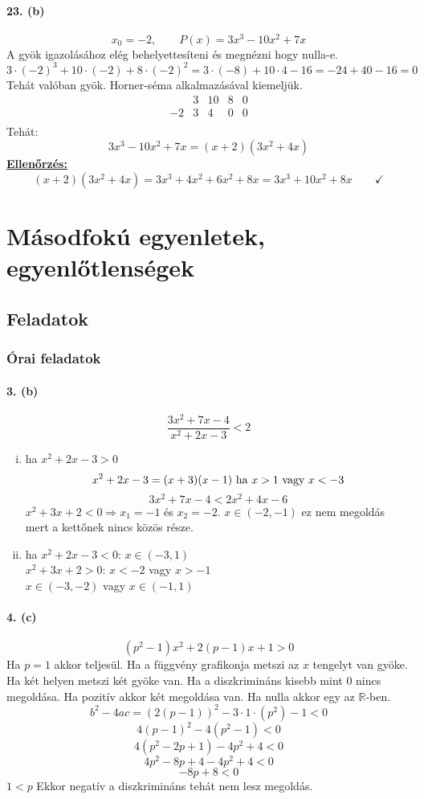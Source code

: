 \documentclass[12pt,a4paper,fleqn]{article}
\newcommand{\myparagraph}[1]{\paragraph{#1}\mbox{}}
\begin{document}
\myparagraph{23. (b)}
\[ x_0 = -2, \qquad P(x) = 3x^3 - 10x^2 + 7x \]
A gyök igazolásához elég behelyettesíteni és megnézni hogy nulla-e.
\[ 3 \cdot (-2)^3 + 10 \cdot (-2) + 8 \cdot (-2)^2 = 3 \cdot (-8) + 10 \cdot 4 - 16 = -24 + 40 - 16 = 0 \]
Tehát valóban gyök. Horner-séma alkalmazásával kiemeljük.
\[
  \begin{array}{c|cccc}
    & 3 & 10 & 8 & 0 \\ \hline
 -2 & 3 & 4  & 0 & 0 \\
 \end{array}
\]
Tehát:
\[
  3x^3 - 10x^2 + 7x=(x+2)(3x^2+4x)
\]
\underline{\textbf{Ellenőrzés:}}
\[
  (x+2)(3x^2+4x)=3x^3+4x^2+6x^2+8x=3x^3+10x^2+8x
  \qquad \checkmark
\]

\section{Másodfokú egyenletek, egyenlőtlenségek}
\setcounter{subsection}{1}
\subsection{Feladatok}
\subsubsection{Órai feladatok}


\myparagraph{3. (b)}
\[ \dfrac{3x^2+7x-4}{x^2+2x-3} < 2 \]
\begin{enumerate}[i.]
  \item ha $x^2+2x-3 > 0$
  \[ x^2+2x-3 = (x+3)(x-1)$ ha $x>1$ vagy $x<-3 \]
  \[ 3x^2+7x-4 < 2x^2+4x-6 \]
  $x^2 + 3x + 2 < 0 \Rightarrow x_1=-1$ és $x_2=-2$. $x \in (-2, -1)$ ez nem megoldás
  mert a kettőnek nincs közös része.
  \item ha $x^2+2x-3 < 0$: $x \in (-3, 1)$ \\
  $x^2+3x+2 > 0$: $x<-2$ vagy $x>-1$ \\
  $x \in (-3, -2)$ vagy $x \in (-1, 1)$
\end{enumerate}


\myparagraph{4. (c)}
\[ (p^2-1)x^2 + 2(p-1)x + 1 > 0 \]
Ha $p=1$ akkor teljesül.
Ha a függvény grafikonja metszi az $x$ tengelyt van gyöke. Ha két helyen metszi
két gyöke van. Ha a diszkrimináns kisebb mint 0 nincs megoldása. Ha pozitív
akkor két megoldása van. Ha nulla akkor egy az $\mathbb{R}$-ben.
\[ b^2-4ac=(2(p-1))^2-3 \cdot 1 \cdot (p^2)-1 < 0 \]
\[ 4(p-1)^2 - 4(p^2 - 1) < 0 \]
\[ 4(p^2 - 2p + 1) - 4p^2 + 4 < 0 \]
\[ 4p^2 - 8p + 4 - 4p^2 + 4 < 0 \]
\[ -8p + 8 < 0 \]
$ 1 < p $ Ekkor negatív a diszkrimináns tehát nem lesz megoldás.
\end{document}

